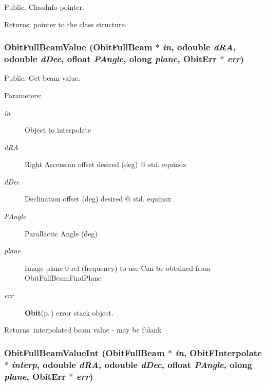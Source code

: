 Public: Class\-Info pointer. 

\begin{Desc}
\item[Returns:]pointer to the class structure. \end{Desc}
\subsubsection{ Obit\-Full\-Beam\-Value ({\bf Obit\-Full\-Beam} $\ast$ {\em in}, {\bf odouble} {\em d\-RA}, {\bf odouble} {\em d\-Dec}, {\bf ofloat} {\em PAngle}, {\bf olong} {\em plane}, {\bf Obit\-Err} $\ast$ {\em err})}\label{ObitFullBeam_8h_a14}


Public: Get beam value. 

\begin{Desc}
\item[Parameters:]
\begin{description}
\item[{\em in}]Object to interpolate \item[{\em d\-RA}]Right Ascension offset desired (deg) @ std. equinox \item[{\em d\-Dec}]Declination offset (deg) desired @ std. equinox \item[{\em PAngle}]Parallactic Angle (deg) \item[{\em plane}]Image plane 0-rel (frequency) to use Can be obtained from Obit\-Full\-Beam\-Find\-Plane \item[{\em err}]{\bf Obit}{\rm (p.\,\pageref{structObit})} error stack object. \end{description}
\end{Desc}
\begin{Desc}
\item[Returns:]interpolated beam value - may be fblank \end{Desc}
\subsubsection{ Obit\-Full\-Beam\-Value\-Int ({\bf Obit\-Full\-Beam} $\ast$ {\em in}, {\bf Obit\-FInterpolate} $\ast$ {\em interp}, {\bf odouble} {\em d\-RA}, {\bf odouble} {\em d\-Dec}, {\bf ofloat} {\em PAngle}, {\bf olong} {\em plane}, {\bf Obit\-Err} $\ast$ {\em err})}\label{ObitFullBeam_8h_a15}


